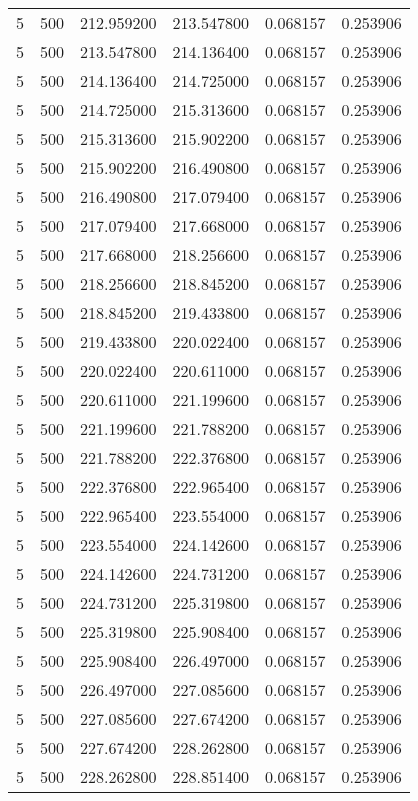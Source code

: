 \begin{longtable}{rrrrrr}
5 & 500 & 212.959200 & 213.547800 & 0.068157 & 0.253906 \\
5 & 500 & 213.547800 & 214.136400 & 0.068157 & 0.253906 \\
5 & 500 & 214.136400 & 214.725000 & 0.068157 & 0.253906 \\
5 & 500 & 214.725000 & 215.313600 & 0.068157 & 0.253906 \\
5 & 500 & 215.313600 & 215.902200 & 0.068157 & 0.253906 \\
5 & 500 & 215.902200 & 216.490800 & 0.068157 & 0.253906 \\
5 & 500 & 216.490800 & 217.079400 & 0.068157 & 0.253906 \\
5 & 500 & 217.079400 & 217.668000 & 0.068157 & 0.253906 \\
5 & 500 & 217.668000 & 218.256600 & 0.068157 & 0.253906 \\
5 & 500 & 218.256600 & 218.845200 & 0.068157 & 0.253906 \\
5 & 500 & 218.845200 & 219.433800 & 0.068157 & 0.253906 \\
5 & 500 & 219.433800 & 220.022400 & 0.068157 & 0.253906 \\
5 & 500 & 220.022400 & 220.611000 & 0.068157 & 0.253906 \\
5 & 500 & 220.611000 & 221.199600 & 0.068157 & 0.253906 \\
5 & 500 & 221.199600 & 221.788200 & 0.068157 & 0.253906 \\
5 & 500 & 221.788200 & 222.376800 & 0.068157 & 0.253906 \\
5 & 500 & 222.376800 & 222.965400 & 0.068157 & 0.253906 \\
5 & 500 & 222.965400 & 223.554000 & 0.068157 & 0.253906 \\
5 & 500 & 223.554000 & 224.142600 & 0.068157 & 0.253906 \\
5 & 500 & 224.142600 & 224.731200 & 0.068157 & 0.253906 \\
5 & 500 & 224.731200 & 225.319800 & 0.068157 & 0.253906 \\
5 & 500 & 225.319800 & 225.908400 & 0.068157 & 0.253906 \\
5 & 500 & 225.908400 & 226.497000 & 0.068157 & 0.253906 \\
5 & 500 & 226.497000 & 227.085600 & 0.068157 & 0.253906 \\
5 & 500 & 227.085600 & 227.674200 & 0.068157 & 0.253906 \\
5 & 500 & 227.674200 & 228.262800 & 0.068157 & 0.253906 \\
5 & 500 & 228.262800 & 228.851400 & 0.068157 & 0.253906 \\

\end{longtable}
